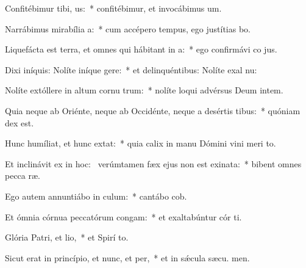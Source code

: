 \item Confitébimur tibi, us:~* confitébimur, et invocábimus  um.
\item Narrábimus mirabília a:~* cum accépero tempus, ego justítias bo.
\item Liquefácta est terra, et omnes qui hábitant in a:~* ego confirmávi co jus.
\item Dixi iníquis: Nolíte iníque gere:~* et delinquéntibus: Nolíte exal nu:
\item Nolíte extóllere in altum cornu trum:~* nolíte loqui advérsus Deum intem.
\item Quia neque ab Oriénte, neque ab Occidénte, neque a desértis tibus:~* quóniam  dex est.
\item Hunc humíliat, et hunc extat:~* quia calix in manu Dómini vini meri  to.
\item Et inclinávit ex  in hoc:~\pscross{} verúmtamen fæx ejus non est exinata:~* bibent omnes pecca ræ.
\item Ego autem annuntiábo in culum:~* cantábo  cob.
\item Et ómnia córnua peccatórum congam:~* et exaltabúntur cór ti.
\item Glória Patri, et lio,~* et Spirí to.
\item Sicut erat in princípio, et nunc, et per,~* et in sǽcula sæcu. men.
